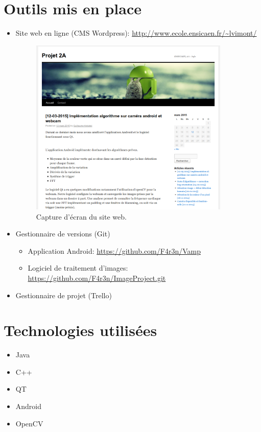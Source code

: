 \section{Outils mis en place}

\begin{itemize}
	\item Site web en ligne (CMS Wordpress): \url{http://www.ecole.ensicaen.fr/~lvimont/} 

		\begin{figure}[h!]
			\centering
			\includegraphics[width=0.9\textwidth]{data/website.png}
			\caption{Capture d'écran du site web.}
		\end{figure}

	\item Gestionnaire de versions (Git) 
		\begin{itemize}[label=\textbullet]
			\item Application Android: \url{https://github.com/F4r3n/Vamp} 
			\item Logiciel de traitement d'images: \url{https://github.com/F4r3n/ImageProject.git} 
		\end{itemize}
	\item Gestionnaire de projet (Trello)
\end{itemize}

\section{Technologies utilisées}

\begin{itemize}[label=\textbullet]
	\item Java 
	\item C++
	\item QT
	\item Android
	\item OpenCV 
\end{itemize}

